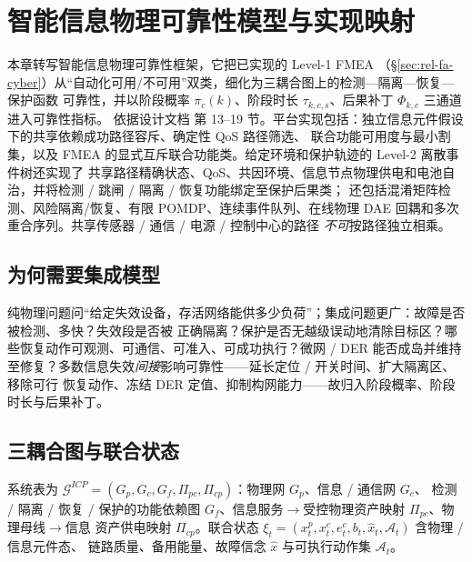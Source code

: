 
\section{智能信息物理可靠性模型与实现映射}\label{sec:rel-icp}

\begin{theorynote}
本章转写智能信息物理可靠性框架，它把已实现的 Level-1 FMEA
（\S\ref{sec:rel-fa-cyber}）从“自动化可用/不可用”双类，细化为三耦合图上的检测—隔离—恢复—保护函数
可靠性，并以阶段概率 $\pi_c(k)$、阶段时长 $\tau_{k,c,s}$、后果补丁 $\Phi_{k,c}$ 三通道进入可靠性指标。
依据设计文档
第 13--19 节。平台实现包括：独立信息元件假设下的共享依赖成功路径容斥、确定性 QoS 路径筛选、
联合功能可用度与最小割集，以及 FMEA 的显式互斥联合功能类。给定环境和保护轨迹的 Level-2 离散事件树还实现了
共享路径精确状态、QoS、共因环境、信息节点物理供电和电池自治，并将检测 / 跳闸 / 隔离 / 恢复功能绑定至保护后果类；
还包括混淆矩阵检测、风险隔离/恢复、有限 POMDP、连续事件队列、在线物理 DAE 回耦和多次重合序列。共享传感器 / 通信 / 电源 / 控制中心的路径
\emph{不可}按路径独立相乘。
\end{theorynote}

\subsection{为何需要集成模型}\label{sec:rel-icp-why}
纯物理问题问“给定失效设备，存活网络能供多少负荷”；集成问题更广：故障是否被检测、多快？失效段是否被
正确隔离？保护是否无越级误动地清除目标区？哪些恢复动作可观测、可通信、可准入、可成功执行？微网 / DER
能否成岛并维持至修复？多数信息失效\emph{间接}影响可靠性——延长定位 / 开关时间、扩大隔离区、移除可行
恢复动作、冻结 DER 定值、抑制构网能力——故归入阶段概率、阶段时长与后果补丁。

\subsection{三耦合图与联合状态}\label{sec:rel-icp-graphs}
系统表为 $\mathcal G^{ICP}=(G_p,G_c,G_f,\Pi_{pc},\Pi_{cp})$：物理网 $G_p$、信息 / 通信网 $G_c$、
检测 / 隔离 / 恢复 / 保护的功能依赖图 $G_f$、信息服务$\to$受控物理资产映射 $\Pi_{pc}$、物理母线$\to$信息
资产供电映射 $\Pi_{cp}$。联合状态 $\xi_t=(x_t^p,x_t^c,e_t^c,b_t,\hat x_t,\mathcal A_t)$ 含物理 / 信息元件态、
链路质量、备用能量、故障信念 $\hat x$ 与可执行动作集 $\mathcal A_t$。

